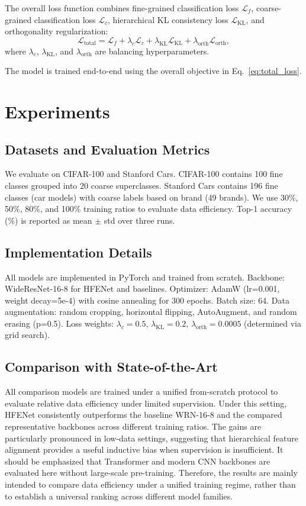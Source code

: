 \documentclass[pdflatex,iicol,sn-mathphys-num]{sn-jnl}
\theoremstyle{thmstyleone}%
\theoremstyle{thmstyletwo}%
\theoremstyle{thmstylethree}%
\begin{document}
The overall loss function combines fine-grained classification loss $\mathcal{L}_f$, coarse-grained classification loss $\mathcal{L}_c$, hierarchical KL consistency loss $\mathcal{L}_{\mathrm{KL}}$, and orthogonality regularization:
\begin{equation}
\mathcal{L}_{\text{total}} = \mathcal{L}_f + \lambda_c \mathcal{L}_c + \lambda_{\mathrm{KL}} \mathcal{L}_{\mathrm{KL}} + \lambda_{\mathrm{orth}} \mathcal{L}_{\mathrm{orth}},
\label{eq:total_loss}
\end{equation}
where $\lambda_c$, $\lambda_{\mathrm{KL}}$, and $\lambda_{\mathrm{orth}}$ are balancing hyperparameters.

The model is trained end-to-end using the overall objective in Eq.~\eqref{eq:total_loss}.

\section{Experiments}
\label{sec:experiments}

\subsection{Datasets and Evaluation Metrics}
We evaluate on CIFAR-100 and Stanford Cars. CIFAR-100 contains 100 fine classes grouped into 20 coarse superclasses. Stanford Cars contains 196 fine classes (car models) with coarse labels based on brand (49 brands). We use 30\%, 50\%, 80\%, and 100\% training ratios to evaluate data efficiency. Top-1 accuracy (\%) is reported as mean $\pm$ std over three runs.

\subsection{Implementation Details}
All models are implemented in PyTorch and trained from scratch. Backbone: WideResNet-16-8 for HFENet and baselines. Optimizer: AdamW (lr=0.001, weight decay=5e-4) with cosine annealing for 300 epochs. Batch size: 64. Data augmentation: random cropping, horizontal flipping, AutoAugment, and random erasing (p=0.5). Loss weights: $\lambda_c=0.5$, $\lambda_{\mathrm{KL}}=0.2$, $\lambda_{\mathrm{orth}}=0.0005$ (determined via grid search).

\subsection{Comparison with State-of-the-Art}
All comparison models are trained under a unified from-scratch protocol to evaluate relative data efficiency under limited supervision. 
Under this setting, HFENet consistently outperforms the baseline WRN-16-8 and the compared representative backbones across different training ratios. 
The gains are particularly pronounced in low-data settings, suggesting that hierarchical feature alignment provides a useful inductive bias when supervision is insufficient. 
It should be emphasized that Transformer and modern CNN backbones are evaluated here without large-scale pre-training. 
Therefore, the results are mainly intended to compare data efficiency under a unified training regime, rather than to establish a universal ranking across different model families.
\end{document}
